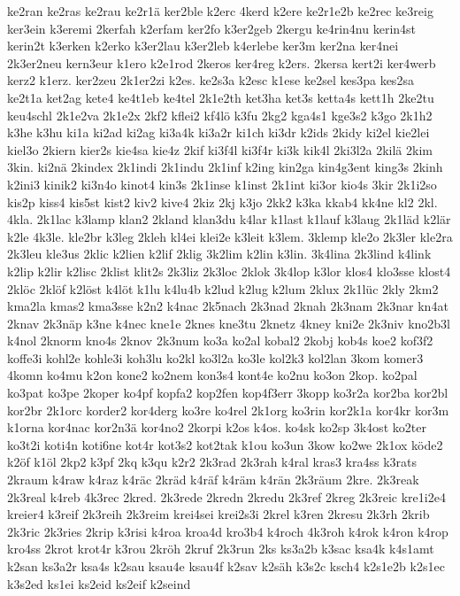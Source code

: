 {ke2ran
ke2ras
ke2rau
ke2r1ä
ker2ble
k2erc
4kerd
k2ere
ke2r1e2b
ke2rec
ke3reig
ker3ein
k3eremi
2kerfah
k2erfam
ker2fo
k3er2geb
2kergu
ke4rin4nu
kerin4st
kerin2t
k3erken
k2erko
k3er2lau
k3er2leb
k4erlebe
ker3m
ker2na
ker4nei
2k3er2neu
kern3eur
k1ero
k2e1rod
2keros
ker4reg
k2ers.
2kersa
kert2i
ker4werb
kerz2
k1erz.
ker2zeu
2k1er2zi
k2es.
ke2s3a
k2esc
k1ese
ke2sel
kes3pa
kes2sa
ke2t1a
ket2ag
kete4
ke4t1eb
ke4tel
2k1e2th
ket3ha
ket3s
ketta4s
kett1h
2ke2tu
keu4schl
2k1e2va
2k1e2x
2kf2
kflei2
kf4lö
k3fu
2kg2
kga4s1
kge3s2
k3go
2k1h2
k3he
k3hu
ki1a
ki2ad
ki2ag
ki3a4k
ki3a2r
ki1ch
ki3dr
k2ids
2kidy
ki2el
kie2lei
kiel3o
2kiern
kier2s
kie4sa
kie4z
2kif
ki3f4l
ki3f4r
ki3k
kik4l
2ki3l2a
2kilä
2kim
3kin.
ki2nä
2kindex
2k1indi
2k1indu
2k1inf
k2ing
kin2ga
kin4g3ent
king3s
2kinh
k2ini3
kinik2
ki3n4o
kinot4
kin3s
2k1inse
k1inst
2k1int
ki3or
kio4s
3kir
2k1i2so
kis2p
kiss4
kis5st
kist2
kiv2
kive4
2kiz
2kj
k3jo
2kk2
k3ka
kkab4
kk4ne
kl2
2kl.
4kla.
2k1lac
k3lamp
klan2
2kland
klan3du
k4lar
k1last
k1lauf
k3laug
2k1läd
k2lär
k2le
4k3le.
kle2br
k3leg
2kleh
kl4ei
klei2e
k3leit
k3lem.
3klemp
kle2o
2k3ler
kle2ra
2k3leu
kle3us
2klic
k2lien
k2lif
2klig
3k2lim
k2lin
k3lin.
3k4lina
2k3lind
k4link
k2lip
k2lir
k2lisc
2klist
klit2s
2k3liz
2k3loc
2klok
3k4lop
k3lor
klos4
klo3sse
klost4
2klöc
2klöf
k2löst
k4löt
k1lu
k4lu4b
k2lud
k2lug
k2lum
2klux
2k1lüc
2kly
2km2
kma2la
kmas2
kma3sse
k2n2
k4nac
2k5nach
2k3nad
2knah
2k3nam
2k3nar
kn4at
2knav
2k3näp
k3ne
k4nec
kne1e
2knes
kne3tu
2knetz
4kney
kni2e
2k3niv
kno2b3l
k4nol
2knorm
kno4s
2knov
2k3num
ko3a
ko2al
kobal2
2kobj
kob4s
koe2
kof3f2
koffe3i
kohl2e
kohle3i
koh3lu
ko2kl
ko3l2a
ko3le
kol2k3
kol2lan
3kom
komer3
4komn
ko4mu
k2on
kone2
ko2nem
kon3s4
kont4e
ko2nu
ko3on
2kop.
ko2pal
ko3pat
ko3pe
2koper
ko4pf
kopfa2
kop2fen
kop4f3err
3kopp
ko3r2a
kor2ba
kor2bl
kor2br
2k1orc
korder2
kor4derg
ko3re
ko4rel
2k1org
ko3rin
kor2k1a
kor4kr
kor3m
k1orna
kor4nac
kor2n3ä
kor4no2
2korpi
k2os
k4os.
ko4sk
ko2sp
3k4ost
ko2ter
ko3t2i
koti4n
koti6ne
kot4r
kot3s2
kot2tak
k1ou
ko3un
3kow
ko2we
2k1ox
köde2
k2öf
k1öl
2kp2
k3pf
2kq
k3qu
k2r2
2k3rad
2k3rah
k4ral
kras3
kra4ss
k3rats
2kraum
k4raw
k4raz
k4räc
2kräd
k4räf
k4räm
k4rän
2k3räum
2kre.
2k3reak
2k3real
k4reb
4k3rec
2kred.
2k3rede
2kredn
2kredu
2k3ref
2kreg
2k3reic
kre1i2e4
kreier4
k3reif
2k3reih
2k3reim
krei4sei
krei2s3i
2krel
k3ren
2kresu
2k3rh
2krib
2k3ric
2k3ries
2krip
k3risi
k4roa
kroa4d
kro3b4
k4roch
4k3roh
k4rok
k4ron
k4rop
kro4ss
2krot
krot4r
k3rou
2kröh
2kruf
2k3run
2ks
ks3a2b
k3sac
ksa4k
k4s1amt
k2san
ks3a2r
ksa4s
k2sau
ksau4e
ksau4f
k2sav
k2säh
k3s2c
ksch4
k2s1e2b
k2s1ec
k3s2ed
ks1ei
ks2eid
ks2eif
k2seind
}
